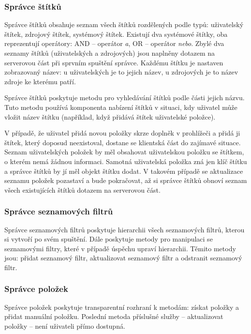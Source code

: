 \subsubsection{Správce štítků}

Správce štítků obsahuje seznam všech štítků rozdělených podle typů: uživatelský štítek, zdrojový štítek, systémový štítek.
Existují dva systémové štítky, oba reprezentují operátory: AND -- operátor \textit{a}, OR -- operátor \textit{nebo}.
Zbylé dva seznamy štítků (uživatelských a zdrojových) jsou naplněny dotazem na serverovou část při sprvním spuštění správce.
Každému štítku je nastaven zobrazovaný název: u uživatelských je to jejich název, u zdrojových je to název zdroje ke kterému patří.

Správce štítků poskytuje metodu pro vyhledávání štítků podle části jejich názvu.
Tuto metodu používá komponenta nabízení štítků v situaci, kdy uživatel může vložit název štítku (například, když přidává štítek uživatelské položce).

V případě, že uživatel přidá novou položky skrze doplněk v prohlížeči a přidá ji štítek, který doposud neexistoval, dostane se klientská část do zajímavé situace.
Seznam uživatelských položek by měl obsahovat uživatelskou položku se štítkem, o kterém nemá žádnou informaci.
Samotná uživatelská položka zná jen klíč štítku a správce štítků by jí měl objekt štítku dodat.
V takovém případě se aktualizace seznamu položek pozastaví a bude pokračovat, až si správce štítků obnoví seznam všech existujících štítků dotazem na serverovou část.

\subsubsection{Správce seznamových filtrů}

Správce seznamových filtrů poskytuje hierarchii všech seznamových filtrů, kterou si vytvoří po svém spuštění.
Dále poskytuje metody pro manipulaci se seznamovými filtry, které v případě úspěchu upraví hierarchii.
Těmito metody jsou: přidat seznamový filtr, aktualizovat seznamový filtr a odstranit seznamový filtr.

\subsubsection{Správce položek}

Správce položek poskytuje transparentní rozhraní k metodám: získat položky a přidat manuální položku.
Poslední metoda příslušné služby – aktualizovat položky – není uživateli přímo dostupná.

